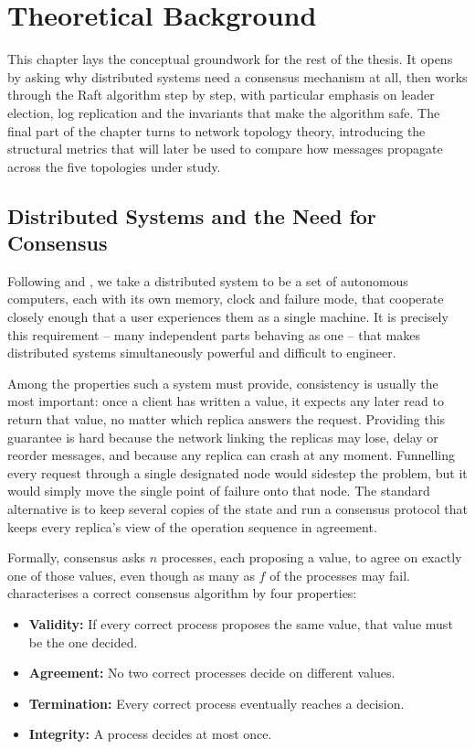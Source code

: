 \chapter{Theoretical Background}
\label{ch:background}

This chapter lays the conceptual groundwork for the rest of the thesis. It opens by asking why distributed systems need a consensus mechanism at all, then works through the Raft algorithm step by step, with particular emphasis on leader election, log replication and the invariants that make the algorithm safe. The final part of the chapter turns to network topology theory, introducing the structural metrics that will later be used to compare how messages propagate across the five topologies under study.

\section{Distributed Systems and the Need for Consensus}

Following \citet{tanenbaum2017} and \citet{coulouris2011}, we take a distributed system to be a set of autonomous computers, each with its own memory, clock and failure mode, that cooperate closely enough that a user experiences them as a single machine. It is precisely this requirement -- many independent parts behaving as one -- that makes distributed systems simultaneously powerful and difficult to engineer.

Among the properties such a system must provide, consistency is usually the most important: once a client has written a value, it expects any later read to return that value, no matter which replica answers the request. Providing this guarantee is hard because the network linking the replicas may lose, delay or reorder messages, and because any replica can crash at any moment. Funnelling every request through a single designated node would sidestep the problem, but it would simply move the single point of failure onto that node. The standard alternative is to keep several copies of the state and run a consensus protocol that keeps every replica's view of the operation sequence in agreement.

Formally, consensus asks $n$ processes, each proposing a value, to agree on exactly one of those values, even though as many as $f$ of the processes may fail. \citet{lamport1998} characterises a correct consensus algorithm by four properties:

\begin{itemize}
    \item \textbf{Validity:} If every correct process proposes the same value, that value must be the one decided.
    \item \textbf{Agreement:} No two correct processes decide on different values.
    \item \textbf{Termination:} Every correct process eventually reaches a decision.
    \item \textbf{Integrity:} A process decides at most once.
\end{itemize}

